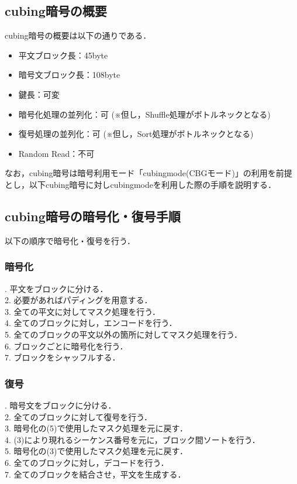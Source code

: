 \documentclass{jsarticle}
\begin{document}
\subsection{cubing暗号の概要}
cubing暗号の概要は以下の通りである．
\begin{itemize}
  \item 平文ブロック長：45byte
  \item 暗号文ブロック長：108byte
  \item 鍵長：可変
  \item 暗号化処理の並列化：可 (※但し，Shuffle処理がボトルネックとなる)
  \item 復号処理の並列化：可 (※但し，Sort処理がボトルネックとなる)
  \item Random Read：不可
\end{itemize}
なお，cubing暗号は暗号利用モード「cubingmode(CBGモード)」の利用を前提とし，以下cubing暗号に対しcubingmodeを利用した際の手順を説明する．
\subsection{cubing暗号の暗号化・復号手順}

以下の順序で暗号化・復号を行う．

\subsubsection{暗号化}
. 平文をブロックに分ける．\\
2. 必要があればパディングを用意する．\\
3. 全ての平文に対してマスク処理を行う．\\
4. 全てのブロックに対し，エンコードを行う．\\
5. 全てのブロックの平文以外の箇所に対してマスク処理を行う．\\
6. ブロックごとに暗号化を行う．\\
7. ブロックをシャッフルする．\\

\subsubsection{復号}
. 暗号文をブロックに分ける．\\
2. 全てのブロックに対して復号を行う．\\
3. 暗号化の(5)で使用したマスク処理を元に戻す．\\
4. (3)により現れるシーケンス番号を元に，ブロック間ソートを行う．\\
5. 暗号化の(3)で使用したマスク処理を元に戻す．\\
6. 全てのブロックに対し，デコードを行う．\\
7. 全てのブロックを結合させ，平文を生成する．\\
\end{document}
